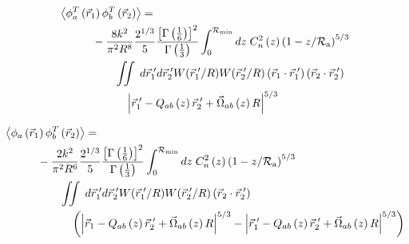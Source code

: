 \begin{equation}\label{eqn:tphase_n6}
\begin{aligned}
&\left\langle \phi^{T}_{a}\left(\vec{r}_{1}\right) \phi^{T}_{b}\left(\vec{r}_{2}\right)\right\rangle = \quad \quad \quad \quad \quad \quad \quad \quad \quad \quad\\
&\quad\quad\quad
-\frac{8k^{2}}{\pi^{2}R^{8}} 
\frac{2^{1/3}}{5}\frac{\left[\Gamma\left(\frac{1}{6}\right)\right]^{2}}{\Gamma\left(\frac{1}{3}\right)} 
\int_{0}^{\mathcal{R}_{\rm min}} dz\;C_{n}^{2}\left(z\right) 
\left(1 - z/\mathcal{R}_{\rm a}\right)^{5/3}\\
&\quad\quad\quad\quad\quad
\iint \; d\vec{r}^{\;\prime}_{1}d\vec{r}^{\;\prime}_{2} W(\vec{r}^{\;\prime}_{1}/R) W(\vec{r}^{\;\prime}_{2}/R)
\left(\vec{r}_{1} \cdot \vec{r}^{\;\prime}_{1}\right)
\left(\vec{r}_{2} \cdot \vec{r}^{\;\prime}_{2}\right)
\\
&\quad\quad\quad\quad\quad\quad
\left\vert \vec{r}^{\;\prime}_{1} - Q_{ab}\left(z\right) \vec{r}^{\;\prime}_{2} + \vec{\Omega}_{ab}\left(z\right) R\right\vert^{5/3}
\end{aligned}
\end{equation}

\begin{equation}\label{eqn:tprphase_n6}
\begin{aligned}
&\left\langle \phi_{a}\left(\vec{r}_{1}\right) \phi^{T}_{b}\left(\vec{r}_{2}\right)\right\rangle = \\
&\quad\quad\quad
-\frac{2k^{2}}{\pi^{2}R^{6}} 
\frac{2^{1/3}}{5}\frac{\left[\Gamma\left(\frac{1}{6}\right)\right]^{2}}{\Gamma\left(\frac{1}{3}\right)} 
\int_{0}^{\mathcal{R}_{\rm min}} dz\;C_{n}^{2}\left(z\right) 
\left(1 - z/\mathcal{R}_{\rm a}\right)^{5/3}\\
&\quad\quad\quad\quad\quad
\iint  \; d\vec{r}^{\;\prime}_{1}d\vec{r}^{\;\prime}_{2} W(\vec{r}^{\;\prime}_{1}/R) W(\vec{r}^{\;\prime}_{2}/R)
\left(\vec{r}_{2} \cdot \vec{r}^{\;\prime}_{2}\right)
\\
&\quad\quad\quad\quad\quad\quad
\left(
\left\vert \vec{r}_{1} - Q_{ab}\left(z\right)\vec{r}^{\;\prime}_{2} + \vec{\Omega}_{ab}\left(z\right) R\right\vert^{5/3}
- \left\vert \vec{r}^{\;\prime}_{1}  - 
 Q_{ab}\left(z\right)\vec{r}^{\;\prime}_{2} + \vec{\Omega}_{ab}\left(z\right) R \right\vert^{5/3}
\right)
\end{aligned}
\end{equation}

